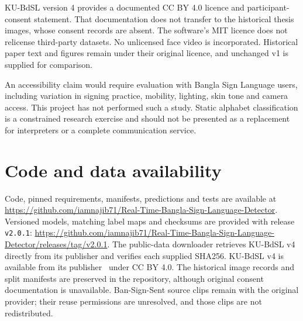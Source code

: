 \documentclass[11pt,a4paper]{article}
\begin{document}
KU-BdSL version 4 provides a documented CC BY 4.0 licence and participant-consent statement. That documentation does not transfer to the historical thesis images, whose consent records are absent. The software's MIT licence does not relicense third-party datasets. No unlicensed face video is incorporated. Historical paper text and figures remain under their original licence, and unchanged v1 is supplied for comparison.

An accessibility claim would require evaluation with Bangla Sign Language users, including variation in signing practice, mobility, lighting, skin tone and camera access. This project has not performed such a study. Static alphabet classification is a constrained research exercise and should not be presented as a replacement for interpreters or a complete communication service.
\section{Code and data availability}
Code, pinned requirements, manifests, predictions and tests are available at \url{https://github.com/iamnajib71/Real-Time-Bangla-Sign-Language-Detector}. Versioned models, matching label maps and checksums are provided with release \texttt{v2.0.1}: \url{https://github.com/iamnajib71/Real-Time-Bangla-Sign-Language-Detector/releases/tag/v2.0.1}. The public-data downloader retrieves KU-BdSL v4 directly from its publisher and verifies each supplied SHA256. KU-BdSL v4 is available from its publisher~\cite{kudata} under CC BY 4.0. The historical image records and split manifests are preserved in the repository, although original consent documentation is unavailable. Ban-Sign-Sent source clips remain with the original provider; their reuse permissions are unresolved, and those clips are not redistributed.
\end{document}
